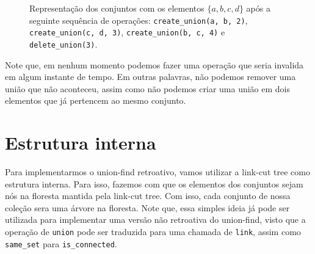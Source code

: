 \begin{figure}[h!]
\begin{subfigure}{\textwidth}
        \bigskip
    \end{subfigure}
    \begin{subfigure}{\textwidth}
        \centering
    \end{subfigure}
    \caption{Representação dos conjuntos com os elementos $\{a,b,c,d\}$ após a seguinte sequência de operações: \texttt{create\_union(a, b, 2)}, \texttt{create\_union(c, d, 3)}, \texttt{create\_union(b, c, 4)} e \texttt{delete\_union(3)}.}
    \label{fig:uf-sets}
\end{figure}

Note que, em nenhum momento podemos fazer uma operação que seria invalida em algum instante de tempo. Em outras palavras, não podemos remover uma união que não aconteceu, assim como não podemos criar uma união em dois elementos que já pertencem ao mesmo conjunto.

\section{Estrutura interna}
\label{sec:uf-estrutura}

Para implementarmos o union-find retroativo, vamos utilizar a link-cut tree como estrutura interna. Para isso, fazemos com que os elementos dos conjuntos sejam nós na floresta mantida pela link-cut tree. Com isso, cada conjunto de nossa coleção sera uma árvore na floresta. Note que, essa simples ideia já pode ser utilizada para implementar uma versão não retroativa do union-find, visto que a operação de \texttt{union} pode ser traduzida para uma chamada de \texttt{link}, assim como \texttt{same\_set} para \texttt{is\_connected}.

